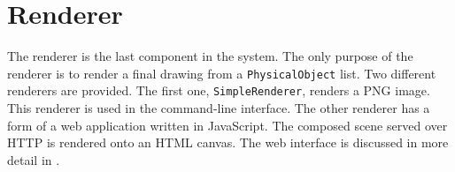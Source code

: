 \section{Renderer}

The renderer is the last component in the system. The only purpose of the renderer is to render a final drawing from a \verb|PhysicalObject| list. Two different renderers are provided. The first one, \verb|SimpleRenderer|, renders a PNG image. This renderer is used in the command-line interface. The other renderer has a form of a web application written in JavaScript. The composed scene served over HTTP is rendered onto an HTML canvas. The web interface is discussed in more detail in .
